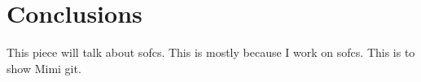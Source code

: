 


\chapter{Conclusions}

This piece will talk about \glspl{sofc}.
This is mostly because I work on \glspl{sofc}.
This is to show Mimi git.\cite{Wang2006}
